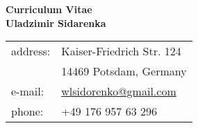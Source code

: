 \documentclass{article}
\begin{document}
\begin{center}
  {\Large \bfseries \sc Curriculum Vitae}\\[2em]
  {\LARGE \bfseries \sc Uladzimir Sidarenka}\\[2em]
\end{center}
\vspace{0.5cm}

\begin{minipage}[t]{0.55\textwidth}
  \begin{flushleft}
  \end{flushleft}
\end{minipage}
\begin{minipage}[t]{0.4\textwidth}
  \begin{flushright}
    \begin{tabular}{ll}
      address: & Kaiser-Friedrich Str. 124\\
      & 14469 Potsdam, Germany\\
      e-mail: & \href{mailto:wlsidorenko@gmail.com}{wlsidorenko@gmail.com}\\
      phone: & +49 176 957 63 296\\
    \end{tabular}
  \end{flushright}
\end{minipage}
\end{document}
